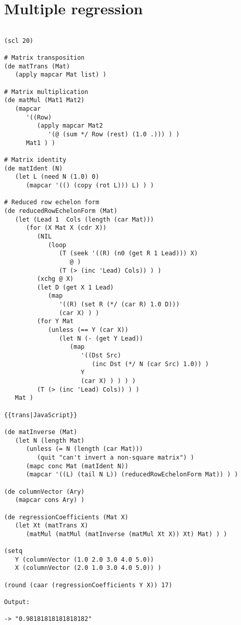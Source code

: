 \section*{Multiple regression}

\begin{verbatim}

(scl 20)

# Matrix transposition
(de matTrans (Mat)
   (apply mapcar Mat list) )

# Matrix multiplication
(de matMul (Mat1 Mat2)
   (mapcar
      '((Row)
         (apply mapcar Mat2
            '(@ (sum */ Row (rest) (1.0 .))) ) )
      Mat1 ) )

# Matrix identity
(de matIdent (N)
   (let L (need N (1.0) 0)
      (mapcar '(() (copy (rot L))) L) ) )

# Reduced row echelon form
(de reducedRowEchelonForm (Mat)
   (let (Lead 1  Cols (length (car Mat)))
      (for (X Mat X (cdr X))
         (NIL
            (loop
               (T (seek '((R) (n0 (get R 1 Lead))) X)
                  @ )
               (T (> (inc 'Lead) Cols)) ) )
         (xchg @ X)
         (let D (get X 1 Lead)
            (map
               '((R) (set R (*/ (car R) 1.0 D)))
               (car X) ) )
         (for Y Mat
            (unless (== Y (car X))
               (let N (- (get Y Lead))
                  (map
                     '((Dst Src)
                        (inc Dst (*/ N (car Src) 1.0)) )
                     Y
                     (car X) ) ) ) )
         (T (> (inc 'Lead) Cols)) ) )
   Mat )

{{trans|JavaScript}}

(de matInverse (Mat)
   (let N (length Mat)
      (unless (= N (length (car Mat)))
         (quit "can't invert a non-square matrix") )
      (mapc conc Mat (matIdent N))
      (mapcar '((L) (tail N L)) (reducedRowEchelonForm Mat)) ) )

(de columnVector (Ary)
   (mapcar cons Ary) )

(de regressionCoefficients (Mat X)
   (let Xt (matTrans X)
      (matMul (matMul (matInverse (matMul Xt X)) Xt) Mat) ) )

(setq
   Y (columnVector (1.0 2.0 3.0 4.0 5.0))
   X (columnVector (2.0 1.0 3.0 4.0 5.0)) )

(round (caar (regressionCoefficients Y X)) 17)

Output:

-> "0.98181818181818182"

\end{verbatim}

